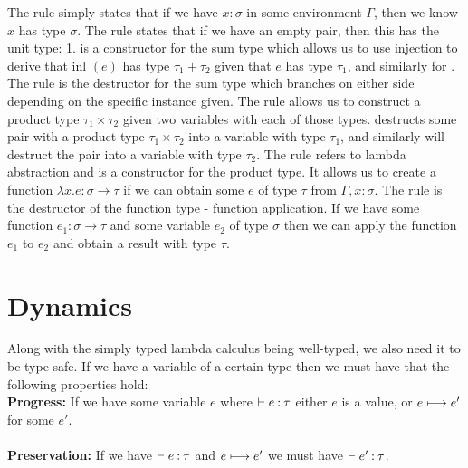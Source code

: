 \noindent
The  rule simply states that if we have $x: \sigma$ in some environment $\Gamma$, 
then we know $x$ has type $\sigma$. The  rule states that if we have an empty pair, then this has 
the unit type: 1.  is a constructor for the sum type which allows us to use injection 
to derive that inl $(e)$ has type $\tau_1 + \tau_2$ given that $e$ has type $\tau_1$, and similarly for 
. The  rule is the destructor for the sum type which branches on either
side depending on the specific instance given. %
The  rule allows us to construct a product type $\tau_1 \times \tau_2$ given two variables
with each of those types.  destructs some pair with a product type $\tau_1 \times \tau_2$ 
into a variable with type $\tau_1$, and similarly  will destruct the pair into a variable 
with type $\tau_2$. 
The  rule refers to lambda abstraction and is a constructor for the product type. It allows
us to create a function $\lambda x. e : \sigma \rightarrow \tau$ if we can obtain some $e$ of type $\tau$
from $\Gamma, x: \sigma$. The  rule is the destructor of the function type - function 
application. If we have some function $e_1: \sigma \rightarrow \tau$ and some variable $e_2$ of type 
$\sigma$ then we can apply the function $e_1$ to $e_2$ and obtain a result with type $\tau$.
\\

\section{Dynamics}

\noindent
Along with the simply typed lambda calculus being well-typed, we also need it to be type safe. If we 
have a variable of a certain type then we must have that the following properties hold: \\

\noindent
\textbf{Progress:} If we have some variable $e$ where $\vdash e\mathbin{:}\tau$ either $e$ is a 
value, or $e \longmapsto e'$ for some $e'$. \\\\
\textbf{Preservation:} If we have $\vdash e\mathbin{:}\tau$ and $e \longmapsto e'$ we must have 
$\vdash e'\mathbin{:}\tau$. \\

